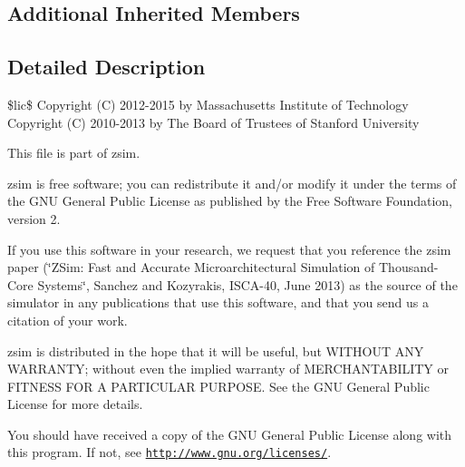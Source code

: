 \subsection*{Additional Inherited Members}


\subsection{Detailed Description}
\$lic\$ Copyright (C) 2012-\/2015 by Massachusetts Institute of Technology Copyright (C) 2010-\/2013 by The Board of Trustees of Stanford University

This file is part of zsim.

zsim is free software; you can redistribute it and/or modify it under the terms of the G\-N\-U General Public License as published by the Free Software Foundation, version 2.

If you use this software in your research, we request that you reference the zsim paper (\char`\"{}\-Z\-Sim\-: Fast and Accurate Microarchitectural Simulation of
\-Thousand-\/\-Core Systems\char`\"{}, Sanchez and Kozyrakis, I\-S\-C\-A-\/40, June 2013) as the source of the simulator in any publications that use this software, and that you send us a citation of your work.

zsim is distributed in the hope that it will be useful, but W\-I\-T\-H\-O\-U\-T A\-N\-Y W\-A\-R\-R\-A\-N\-T\-Y; without even the implied warranty of M\-E\-R\-C\-H\-A\-N\-T\-A\-B\-I\-L\-I\-T\-Y or F\-I\-T\-N\-E\-S\-S F\-O\-R A P\-A\-R\-T\-I\-C\-U\-L\-A\-R P\-U\-R\-P\-O\-S\-E. See the G\-N\-U General Public License for more details.

You should have received a copy of the G\-N\-U General Public License along with this program. If not, see \href{http://www.gnu.org/licenses/}{\tt http\-://www.\-gnu.\-org/licenses/}. 

